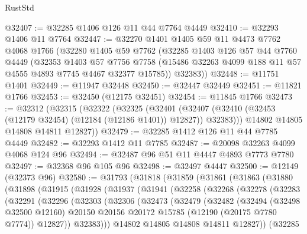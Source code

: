 \begin{lexlean}{RustStd}
\begin{coremodule}
@32407 := @32285 @1406 @126 @11 @44 @7764 @4449
@32410 := @32293 @1406 @11 @7764
@32447 := @32270
    @1401
    @1405
    @59
    @11
    @4473
    @7762
    @4068
    @1766
    (@32280
      @1405
      @59
      @7762
      (@32285
        @1403
        @126
        @57
        @44
        @7760
        @4449
        (@32353
          @1403
          @57
          @7756
          @7758
          (@15486 @32263 @4099 @188 @11 @57 @4555 @4893 @7745 @4467 @32377 @15785))
        @32383))
@32448 := @11751 @1401
@32449 := @11947 @32448
@32450 := @32447 @32449
@32451 := @11821 @1766
@32453 := @32450 (@12175 @32451)
@32454 := @11845 @1766
@32473 := @32312
    (@32315
      (@32322
        (@32325
          (@32401 (@32407 (@32410 (@32453 (@12179 @32454) (@12184 (@12186 @1401)) @12827)) @32383)))
        @14802
        @14805
        @14808
        @14811
        @12827))
@32479 := @32285 @1412 @126 @11 @44 @7785 @4449
@32482 := @32293 @1412 @11 @7785
@32487 := @20098 @32263 @4099 @4068 @124 @96
@32494 := @32487 @96 @51 @11 @4447 @4893 @7773 @7780
@32497 := @32368 @96 @105 @96
@32498 := @32497 @4447
@32500 := @12149 (@32373 @96)
@32580 := @31793
    (@31818
      (@31859
        (@31861
          (@31863
            (@31880
              (@31898
                (@31915
                  (@31928
                    (@31937
                      (@31941
                        (@32258
                          (@32268
                            (@32278
                              (@32283
                                (@32291
                                  (@32296
                                    (@32303
                                      (@32306
                                        (@32473
                                          (@32479
                                            (@32482
                                              (@32494
                                                (@32498 @32500 @12160)
                                                @20150
                                                @20156
                                                @20172
                                                @15785
                                                (@12190 (@20175 @7780 @7774))
                                                @12827))
                                            @32383)))
                                      @14802
                                      @14805
                                      @14808
                                      @14811
                                      @12827))
                                  (@32285

\end{coremodule}
\end{lexlean}
